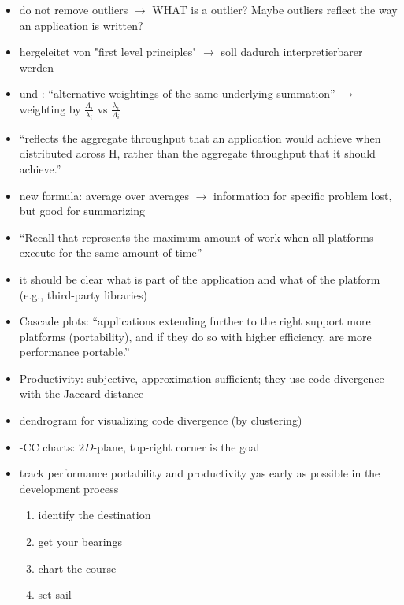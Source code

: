 \begin{itemize}
    \item do not remove outliers $\rightarrow$ WHAT is a outlier? Maybe outliers reflect the way an application is written?
    \item hergeleitet von "first level principles" $\rightarrow$ \pp soll dadurch interpretierbarer werden
    \item \pp und \mpp: \enquote{alternative weightings of the same underlying summation} $\rightarrow$ weighting by $\frac{\Lambda_i}{\lambda_i}$  vs $\frac{\lambda_i}{\Lambda_i}$
    \item \enquote{\mpp reflects the aggregate throughput that an application would achieve when distributed across H, rather than the aggregate throughput that it should achieve.}
    \item new formula: average over averages $\rightarrow$ information for specific problem lost, but good for summarizing
    \item \enquote{Recall that \pp represents the maximum amount of work when all platforms execute for the same amount of time}
\end{itemize}


\newpage
\cite{pennycook_navigating_2021}

\begin{itemize}
    \item it should be clear what is part of the application and what of the platform (e.g., third-party libraries)
    \item Cascade plots: \enquote{applications extending further to the right support more platforms (portability), and if they do so with higher efficiency, are more performance portable.}
    \item Productivity: subjective, approximation sufficient; they use \cite{harrell_effective_2018} code divergence with the Jaccard distance
    \item dendrogram for visualizing code divergence (by clustering)
    \item \pp-CC charts: $2D$-plane, top-right corner is the goal
    \item track performance portability and productivity yas early as possible in the development process
    \begin{enumerate}
        \item identify the destination
        \item get your bearings
        \item chart the course
        \item set sail
    \end{enumerate}
\end{itemize}

